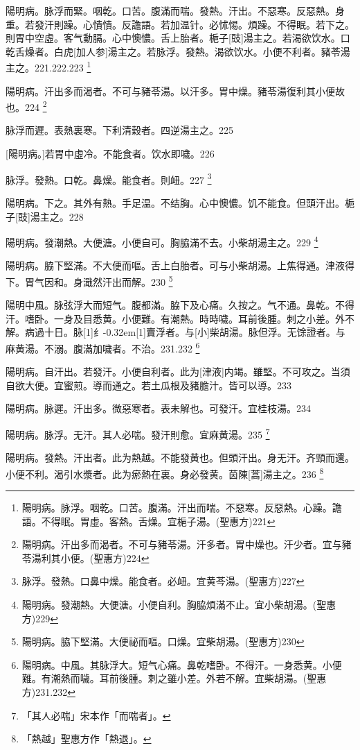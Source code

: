 \documentclass[11pt,oneside,b5paper]{ctexbook}
\begin{document}
\begin{flushleft}
陽明病。脉浮而緊。咽乾。口苦。腹滿而喘。發熱。汗出。不惡寒。反惡熱。身重。若發汗則躁。心憒憒。反譫語。若加温针。必怵惕。煩躁。不得眠。若下之。則胃中空虛。客气動膈。心中懊憹。舌上胎者。梔子[豉]湯主之。若渴欲饮水。口乾舌燥者。白虎[加人参]湯主之。若脉浮。發熱。渴欲饮水。小便不利者。豬苓湯主之。221.222.223
\footnote{陽明病。脉浮。咽乾。口苦。腹滿。汗出而喘。不惡寒。反惡熱。心躁。譫語。不得眠。胃虛。客熱。舌燥。宜梔子湯。(聖惠方)221}

陽明病。汗出多而渴者。不可与豬苓湯。以汗多。胃中燥。豬苓湯復利其小便故也。224
\footnote{陽明病。汗出多而渴者。不可与豬苓湯。汗多者。胃中燥也。汗少者。宜与豬苓湯利其小便。(聖惠方)224}

脉浮而遲。表熱裏寒。下利清穀者。四逆湯主之。225

[陽明病。]若胃中虛冷。不能食者。饮水即噦。226

脉浮。發熱。口乾。鼻燥。能食者。則衄。227
\footnote{脉浮。發熱。口鼻中燥。能食者。必衄。宜黄芩湯。(聖惠方)227}

陽明病。下之。其外有熱。手足温。不结胸。心中懊憹。饥不能食。但頭汗出。梔子[豉]湯主之。228

陽明病。發潮熱。大便溏。小便自可。胸脇滿不去。小柴胡湯主之。229
\footnote{陽明病。發潮熱。大便溏。小便自利。胸脇煩滿不止。宜小柴胡湯。(聖惠方)229}

陽明病。脇下堅滿。不大便而嘔。舌上白胎者。可与小柴胡湯。上焦得通。津液得下。胃气因和。身濈然汗出而解。230
\footnote{陽明病。脇下堅滿。大便祕而嘔。口燥。宜柴胡湯。(聖惠方)230}

陽明中風。脉弦浮大而短气。腹都滿。脇下及心痛。久按之。气不通。鼻乾。不得汗。嗜卧。一身及目悉黄。小便難。有潮熱。時時噦。耳前後腫。刺之小差。外不解。病過十日。脉{\hbox{\scalebox{0.6}[1]{纟}\kern-0.32em\scalebox{0.7}[1]{賣}}}浮者。与[小]柴胡湯。脉但浮。无馀證者。与麻黄湯。不溺。腹滿加噦者。不治。231.232
\footnote{陽明病。中風。其脉浮大。短气心痛。鼻乾嗜卧。不得汗。一身悉黄。小便難。有潮熱而噦。耳前後腫。刺之雖小差。外若不解。宜柴胡湯。(聖惠方)231.232}

陽明病。自汗出。若發汗。小便自利者。此为[津液]内竭。雖堅。不可攻之。当須自欲大便。宜蜜煎。導而通之。若土瓜根及豬膽汁。皆可以導。233

陽明病。脉遲。汗出多。微惡寒者。表未解也。可發汗。宜桂枝湯。234

陽明病。脉浮。无汗。其人必喘。發汗則愈。宜麻黄湯。235
\footnote{「其人必喘」宋本作「而喘者」。}

陽明病。發熱。汗出者。此为熱越。不能發黄也。但頭汗出。身无汗。齐頸而還。小便不利。渴引水漿者。此为瘀熱在裏。身必發黄。茵陳[蒿]湯主之。236
\footnote{「熱越」聖惠方作「熱退」。}


\end{flushleft}
\end{document}
